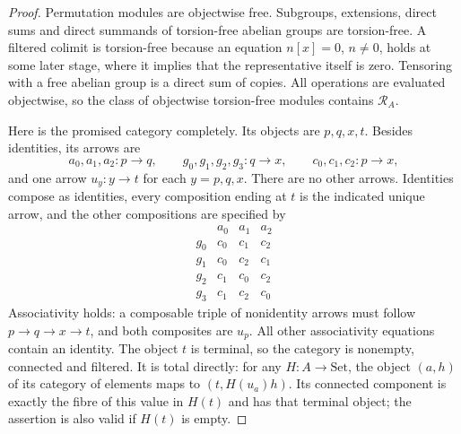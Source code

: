 \begin{proof}
Permutation modules are objectwise free.  Subgroups, extensions,
direct sums and direct summands of torsion-free abelian groups are
torsion-free.  A filtered colimit is torsion-free because an equation
$n[x]=0$, $n\ne0$, holds at some later stage, where it implies that
the representative itself is zero.  Tensoring with a free abelian
group is a direct sum of copies.  All operations are evaluated
objectwise, so the class of objectwise torsion-free modules contains
$\mathcal R_A$.

Here is the promised category completely.  Its objects are $p,q,x,t$.
Besides identities, its arrows are
\[
 a_0,a_1,a_2:p\to q,\qquad
 g_0,g_1,g_2,g_3:q\to x,\qquad
 c_0,c_1,c_2:p\to x,
\]
and one arrow $u_y:y\to t$ for each $y=p,q,x$.  There are no other
arrows.  Identities compose as identities, every composition ending
at $t$ is the indicated unique arrow, and the other compositions are
specified by
\[
\begin{array}{c|ccc}
 &a_0&a_1&a_2\\\hline
g_0&c_0&c_1&c_2\\
g_1&c_0&c_2&c_1\\
g_2&c_1&c_0&c_2\\
g_3&c_1&c_2&c_0
\end{array}
\]
Associativity holds: a composable triple of nonidentity arrows must
follow $p\to q\to x\to t$, and both composites are $u_p$.
All other associativity equations contain an identity.
The object $t$ is terminal, so the category is nonempty, connected
and filtered.  It is total directly: for any $H:A\to\mathrm{Set}$,
the object $(a,h)$ of its category of elements maps to
$(t,H(u_a)h)$.  Its connected component is exactly the fibre of this
value in $H(t)$ and has that terminal object; the assertion is also
valid if $H(t)$ is empty.


\end{proof}
